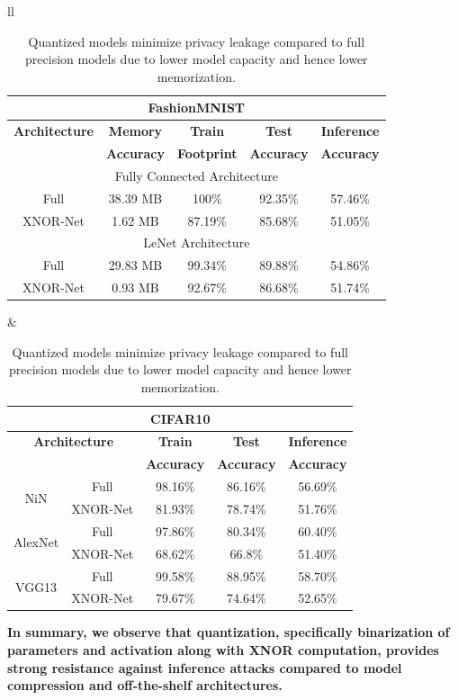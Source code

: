\begin{table}[h]
\begin{center}
\renewcommand\arraystretch{1.5}
\fontsize{6.5pt}{6.5pt}\selectfont
\begin{tabular}{ll}
\begin{tabular}{|c|c|c|c|c|}
\hline
\multicolumn{5}{|c|}{\textbf{FashionMNIST}}\\
\hline
\textbf{Architecture} & \textbf{Memory} & \textbf{Train}  & \textbf{Test}  & \textbf{Inference}  \\
 & \textbf{Accuracy} &  \textbf{Footprint} & \textbf{Accuracy} & \textbf{Accuracy}  \\
\hline
\multicolumn{5}{|c|}{Fully Connected Architecture}\\
Full & 38.39 MB & 100\% & 92.35\% & \cellcolor{red!25}57.46\%\\
XNOR-Net & 1.62 MB & 87.19\% & 85.68\% & \cellcolor{green!25}51.05\%\\ %
\hline
\multicolumn{5}{|c|}{LeNet Architecture}\\
Full & 29.83 MB & 99.34\% & 89.88\% & \cellcolor{red!25}54.86\% \\
XNOR-Net & 0.93 MB & 92.67\% & 86.68\% & \cellcolor{green!25}51.74\%\\ %
\hline
\end{tabular}
&
\begin{tabular}{|c|c|c|c|c|}
\hline
\multicolumn{5}{|c|}{\textbf{CIFAR10}} \\
\hline
\multicolumn{2}{|c|}{\textbf{Architecture}} & \textbf{Train}  & \textbf{Test}  & \textbf{Inference}  \\
 \multicolumn{2}{|c|}{} & \textbf{Accuracy} & \textbf{Accuracy} & \textbf{Accuracy}  \\
\hline
\multirow{2}{*}{NiN} & Full & 98.16\% & 86.16\% & \cellcolor{red!25}56.69\% \\
& XNOR-Net & 81.93\% & 78.74\% & \cellcolor{green!25}51.76\% \\
\hline
\multirow{2}{*}{AlexNet} & Full & 97.86\% & 80.34\% & \cellcolor{red!25}60.40\% \\
& XNOR-Net & 68.62\% & 66.8\% & \cellcolor{green!25}51.40\% \\
\hline
\multirow{2}{*}{VGG13} & Full & 99.58\% & 88.95\% & \cellcolor{red!25}58.70\%\\
& XNOR-Net & 79.67\% & 74.64\% & \cellcolor{green!25}52.65\%\\
\hline
\end{tabular}
\end{tabular}
\end{center}
\caption{Quantized models minimize privacy leakage compared to full precision models due to lower model capacity and hence lower memorization.}
\end{table}


\textbf{In summary, we observe that quantization, specifically binarization of parameters and activation along with XNOR computation, provides strong resistance against inference attacks compared to model compression and off-the-shelf architectures.}
